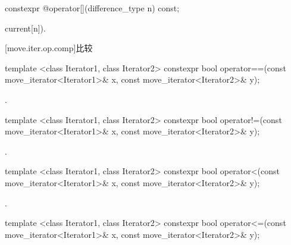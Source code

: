 %
%
\begin{itemdecl}
constexpr @\unspec@ operator[](difference_type n) const;
\end{itemdecl}

\begin{itemdescr}
\pnum
\returns {}current[n]).
\end{itemdescr}

[move.iter.op.comp]{比较}

%
%
\begin{itemdecl}
template <class Iterator1, class Iterator2>
constexpr bool operator==(const move_iterator<Iterator1>& x, const move_iterator<Iterator2>& y);
\end{itemdecl}

\begin{itemdescr}
\pnum
\returns {}.
\end{itemdescr}

%
%
\begin{itemdecl}
template <class Iterator1, class Iterator2>
constexpr bool operator!=(const move_iterator<Iterator1>& x, const move_iterator<Iterator2>& y);
\end{itemdecl}

\begin{itemdescr}
\pnum
\returns {}.
\end{itemdescr}

%
%
\begin{itemdecl}
template <class Iterator1, class Iterator2>
constexpr bool operator<(const move_iterator<Iterator1>& x, const move_iterator<Iterator2>& y);
\end{itemdecl}

\begin{itemdescr}
\pnum
\returns {}.
\end{itemdescr}

%
%
\begin{itemdecl}
template <class Iterator1, class Iterator2>
constexpr bool operator<=(const move_iterator<Iterator1>& x, const move_iterator<Iterator2>& y);
\end{itemdecl}

